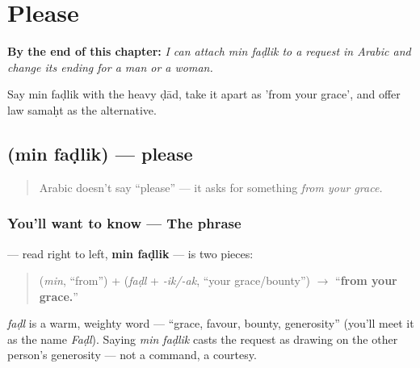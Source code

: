 
\chapter{Please}
\label{ch:ar-please}

\begin{chapteropening}
\textbf{By the end of this chapter:} \emph{I can attach min faḍlik to a request in Arabic and change its ending for a man or a woman.}

Say min faḍlik with the heavy ḍād, take it apart as 'from your grace', and offer law samaḥt as the alternative.
\end{chapteropening}

\section[\texorpdfstring{\ar{من} \ar{فضلك} (min faḍlik)}{من فضلك (min faḍlik)}]{  (min faḍlik) — please}

\label{lesson:AR-C06-min-fadlik}



\begin{quote}
Arabic doesn't say \textquotedblleft{}please\textquotedblright{} — it asks for something \emph{from your grace.}
\end{quote}

\subsection*{You'll want to know — The phrase}
\textbf{ } — read right to left, \textbf{min faḍlik} — is two pieces:

\begin{quote}
\textbf{} (\emph{min}, \textquotedblleft{}from\textquotedblright{}) + \textbf{} (\emph{faḍl} + \emph{-ik/-ak}, \textquotedblleft{}your grace/bounty\textquotedblright{}) $\to$ \textquotedblleft{}\textbf{from your grace.}\textquotedblright{}
\end{quote}

\emph{faḍl} is a warm, weighty word — \textquotedblleft{}grace, favour, bounty, generosity\textquotedblright{} (you'll meet it as the name \emph{Faḍl}). Saying \emph{min faḍlik} casts the request as drawing on the other person's generosity — not a command, a courtesy.

